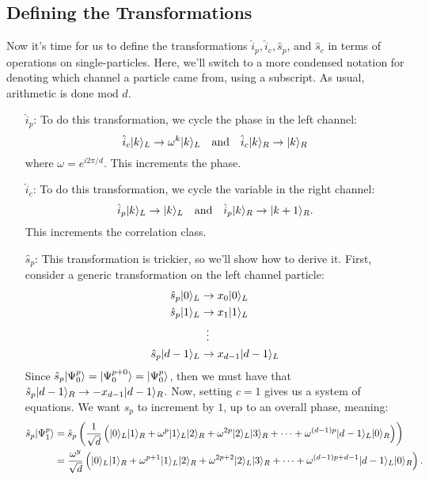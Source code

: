 \subsection{Defining the Transformations}
Now it's time for us to define the transformations $\hat{i}_p, \hat{i}_c, \hat{s}_p$, and $\hat{s}_c$ in terms of operations on single-particles. Here, we'll switch to a more condensed notation for denoting which channel a particle came from, using a subscript.
As usual, arithmetic is done $\text{mod } d$. 
\begin{enumerate}
  \item[$\hat{i}_p$:] To do this transformation, we cycle the phase in the left channel:
  \[
  \hat{i}_c | k \rangle_L \rightarrow \omega^k | k \rangle_L \quad \text{and} \quad \hat{i}_c | k \rangle_R \rightarrow | k \rangle_R
  \]
  where $\omega = e^{i 2 \pi / d}$. This increments the phase.
  \item[$\hat{i}_c$:] To do this transformation, we cycle the variable in the right channel:
  \[
  \hat{i}_p | k \rangle_L \rightarrow | k \rangle_L \quad \text{and} \quad \hat{i}_p | k \rangle_R \rightarrow | k + 1 \rangle_R.
  \]
  This increments the correlation class.
  \item[$\hat{s}_p$:] This transformation is trickier, so we'll show how to derive it. First, consider a generic transformation on the left channel particle:
\begin{equation}
\begin{split}
    \hat{s}_p | 0 \rangle_L & \rightarrow x_0 | 0 \rangle_L \\
    \hat{s}_p | 1 \rangle_L & \rightarrow x_1 | 1 \rangle_L \\
    & \; \; \vdots \\
    \hat{s}_p | d-1 \rangle_L & \rightarrow x_{d-1}| d-1 \rangle_L
\end{split}
\end{equation}
  Since $\hat{s}_p | \Psi_0^p \rangle = | \Psi_0^{p+0} \rangle = | \Psi_0^p \rangle$, then we must have that $\hat{s}_p | d-1 \rangle_R \rightarrow -x_{d-1}| d-1 \rangle_R$. Now, setting $c=1$ gives us a system of equations. We want $\hat{s}_p$ to increment by $1$, up to an overall phase, meaning:
\begin{equation}
  \begin{split}
        \hat{s}_p \ket{\Psi_1^p} &= \hat{s}_p  \pn{ \frac{1}{\sqrt{d}}\pn{\ket{0}_L\ket{1}_R + \omega^{p} \ket{1}_L\ket{2}_R + \omega^{2 p} \ket{2}_L\ket{3}_R + \cdots + \omega^{(d-1)p} \ket{d-1}_L\ket{0}_R} } \\
                             &= \frac{\omega^{y}}{\sqrt{d}}\pn{\ket{0}_L\ket{1}_R + \omega^{p+1} \ket{1}_L\ket{2}_R + \omega^{2 p + 2} \ket{2}_L\ket{3}_R +  \cdots + \omega^{(d-1)p + d - 1} \ket{d-1}_L\ket{0}_R}.

\end{split}
\end{equation}
\end{enumerate}
